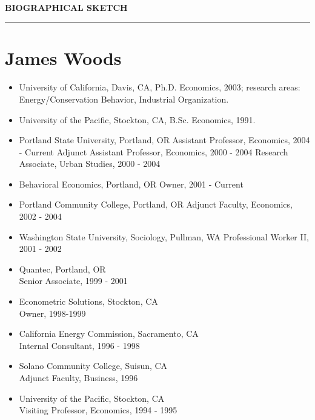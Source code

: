 \documentclass[times,12pt]{article} %
\begin{document}
 
~~\\
\begin{center}
{\bf \Large BIOGRAPHICAL SKETCH}
\vspace{0.05in}
\hrule
\end{center}
\section*{James Woods}

\begin{itemize}
 \item University of California, Davis, CA, Ph.D. Economics, 2003; research areas: Energy/Conservation Behavior, Industrial Organization.

\item University of the Pacific, Stockton, CA, B.Sc.  Economics, 1991.

\end{itemize}



\begin{itemize}
 \item Portland State University, Portland, OR
Assistant Professor, Economics, 2004 - Current
Adjunct Assistant Professor, Economics, 2000 - 2004
Research Associate, Urban Studies, 2000 - 2004

 \item Behavioral Economics, Portland, OR
Owner, 2001 - Current

 \item Portland Community College, Portland, OR
Adjunct Faculty, Economics, 2002 - 2004

 \item Washington State University, Sociology, Pullman, WA
Professional Worker II, 2001 - 2002
	
  \item Quantec, Portland, OR\\
    Senior Associate, 1999 - 2001
	
  \item Econometric Solutions, Stockton, CA\\
    Owner, 1998-1999
		
  \item California Energy Commission, Sacramento, CA\\
    Internal Consultant, 1996 - 1998
	
  \item Solano Community College, Suisun, CA\\
    Adjunct Faculty, Business, 1996
		
  \item University of the Pacific, Stockton, CA\\
    Visiting Professor, Economics, 1994 - 1995
\end{itemize}
\end{document}
